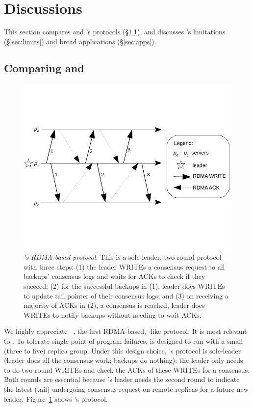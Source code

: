 \section{Discussions}\label{sec:discuss}
% 
This section compares \xxx and \dare's protocols (\S\ref{sec:compare}), and 
discusses \xxx's limitations (\S\ref{sec:limits}) and broad applications 
(\S\ref{sec:apps}).

\subsection{Comparing \xxx and \dare}\label{sec:compare}

\begin{figure}[t]
\centering
\vspace{-.5in}
\includegraphics[width=.35\textwidth]{figures/dare_algo}
\vspace{-.6in}
\caption{{\em \dare's RDMA-based protocol.} This is a sole-leader, 
two-round protocol with three steps: (1) the leader WRITEs a consensus request 
to all backups' consensus logs and waits for ACKs to check if they succeed; 
(2) for the successful backups in (1), leader does WRITEs to update tail 
pointer of their consensus logs; and (3) on receiving a majority of ACKs in (2), 
a consensus is reached, leader does WRITEs to notify backups without needing to 
wait ACKs.}
\label{fig:dare}
\vspace{-.20in}
\end{figure}

We highly appreciate \dare~\cite{dare:hpdc15}, the first RDMA-based, 
\paxos-like protocol. It is most relevant to \xxx. To tolerate single point of 
program failures, \dare is designed to run with a small (three to five) replica 
group. Under this design choice, \dare's protocol is sole-leader (leader 
does all the consensus work; backups do nothing): the leader only needs to do 
two-round WRITEs and check the ACKs of these WRITEs for a consensus. Both 
rounds are essential because \dare's leader needs the second round to indicate 
the latest (tail) undergoing consensus request on remote replicas for a future 
new leader. Figure~\ref{fig:dare} shows \dare's protocol.


